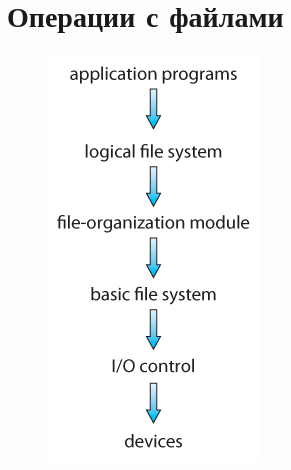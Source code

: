 \documentclass[../../lectures.tex]{subfiles}
\begin{document}
\section{Операции с файлами}
\begin{figure}[H]
\begin{minipage}[c]{0.25\linewidth}
\centering
\includegraphics[width=\textwidth]{images/layered.jpg}

\end{minipage}
\end{figure}
\end{document}
